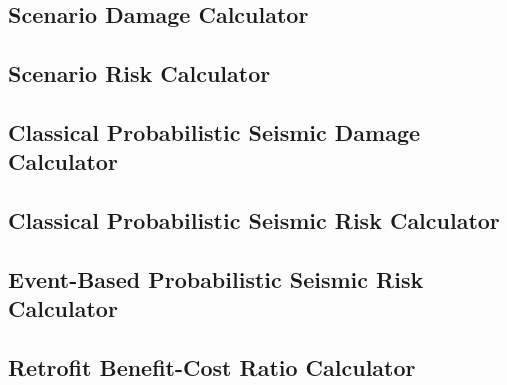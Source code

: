 \subsection{Scenario Damage Calculator}
\label{subsec:config_scenario_damage}


\subsection{Scenario Risk Calculator}
\label{subsec:config_scenario_risk}


\subsection{Classical Probabilistic Seismic Damage Calculator}
\label{subsec:config_classical_damage}


\subsection{Classical Probabilistic Seismic Risk Calculator}
\label{subsec:config_classical_risk}


\subsection{Event-Based Probabilistic Seismic Risk Calculator}
\label{subsec:config_event_based_risk}


\subsection{Retrofit Benefit-Cost Ratio Calculator}
\label{subsec:config_benefit_cost}


\cleardoublepage